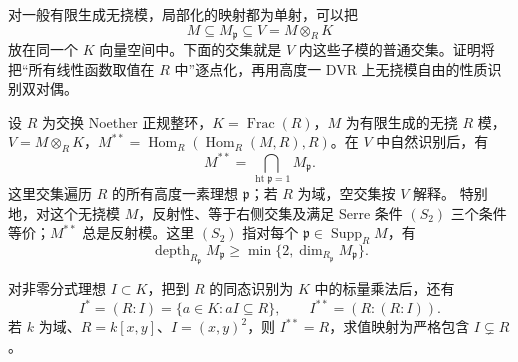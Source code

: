 \ProseParagraphBreak
对一般有限生成无挠模，局部化的映射都为单射，可以把
\[
	M\subseteq M_{\mathfrak p}\subseteq V=M\otimes_RK
\]
放在同一个 \(K\) 向量空间中。下面的交集就是 \(V\) 内这些子模的普通交集。证明将把“所有线性函数取值在 \(R\) 中”逐点化，再用高度一 DVR 上无挠模自由的性质识别双对偶。

\begin{theorem}\label{b3:thm:reflexive-height-one}\label{b3:thm:rank-one-dual-colon}\label{b3:thm:reflexive-serre-s2}
	设 \(R\) 为交换 Noether 正规整环，\(K=\operatorname{Frac}(R)\)，\(M\) 为有限生成的无挠 \(R\) 模，\(V=M\otimes_RK\)，\(M^{**}=\operatorname{Hom}_R(\operatorname{Hom}_R(M,R),R)\)。在 \(V\) 中自然识别后，有
	\[
		M^{**}=\bigcap_{\operatorname{ht}\mathfrak p=1}M_{\mathfrak p}.
	\]
	这里交集遍历 \(R\) 的所有高度一素理想 \(\mathfrak p\)；若 \(R\) 为域，空交集按 \(V\) 解释。 特别地，对这个无挠模 \(M\)，反射性、等于右侧交集及满足 Serre 条件 \((S_2)\) 三个条件等价；\(M^{**}\) 总是反射模。这里 \((S_2)\) 指对每个 \(\mathfrak p\in\operatorname{Supp}_R M\)，有
	\[
		\operatorname{depth}_{R_{\mathfrak p}}M_{\mathfrak p} \ge\min\{2,\dim_{R_{\mathfrak p}}M_{\mathfrak p}\}.
	\]

	对非零分式理想 \(I\subset K\)，把到 \(R\) 的同态识别为 \(K\) 中的标量乘法后，还有
	\[
		I^*=(R:I)=\{a\in K:aI\subseteq R\},\qquad I^{**}=(R:(R:I)).
	\]
	若 \(k\) 为域、\(R=k[x,y]\)、\(I=(x,y)^2\)，则 \(I^{**}=R\)，求值映射为严格包含 \(I\subsetneq R\)。
\end{theorem}

